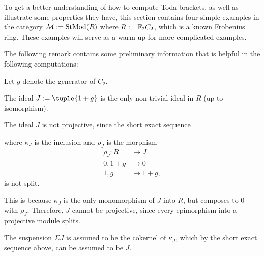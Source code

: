 To get a better understanding of how to compute Toda brackets, as well as illustrate some properties they have, this section contains four simple examples in the category \( {\mathcal{M}} := \operatorname{StMod}(R) \) where \( R := {\mathbb{F}}_2 C_2 \), which is a known Frobenius ring. These examples will serve as a warm-up for more complicated examples.

The following remark contains some preliminary information that is helpful in the following computations:

\begin{remark}
	\label{rem:toda_bracket_examples_properties}
    Let \( g \) denote the generator of \( C_2 \).

    The ideal \( J := \tuple{1 + g} \) is the only non-trivial ideal in \( R \) (up to isomorphism).

    The ideal \( J \) is not projective, since the short exact sequence
    \begin{center}
    \end{center}
    where \( \kappa_J \) is the inclusion and \( \rho_J \) is the morphism
    \begin{align*}
        \rho_J: R &\to J \\
        0, 1 + g &\mapsto 0 \\
        1, g &\mapsto 1 + g,
    \end{align*}
    is not split.

    This is because \( \kappa_J \) is the only monomorphism of \( J \) into \( R \), but composes to \( 0 \) with \( \rho_J \). Therefore, \( J \) cannot be projective, since every epimorphism into a projective module splits.

    The suspension \( \Sigma J \) is assumed to be the cokernel of \( \kappa_J \), which by the short exact sequence above, can be assumed to be \( J \).

\end{remark}

